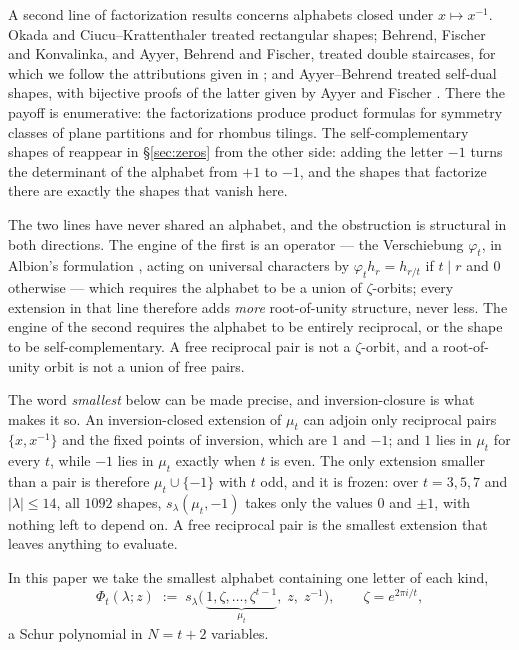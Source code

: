 \documentclass[11pt,reqno]{amsart}
\theoremstyle{plain}
\theoremstyle{definition}
\newcommand{\zt}{\mu_t}
\begin{document}
A second line of factorization results concerns alphabets closed under $x\mapsto x^{-1}$. Okada
\cite{Oka98} and Ciucu--Krattenthaler \cite{CK09} treated rectangular shapes; Behrend, Fischer and
Konvalinka, and Ayyer, Behrend and Fischer, treated double staircases, for which we follow the
attributions given in \cite{AB19}; and Ayyer--Behrend
\cite{AB19} treated self-dual shapes, with bijective proofs of the latter given by Ayyer and Fischer
\cite{AF20}. There the payoff is enumerative: the factorizations produce
product formulas for symmetry classes of plane partitions and for rhombus tilings. The
self-complementary shapes of \cite{AB19} reappear in \S\ref{sec:zeros} from the other side: adding
the letter $-1$ turns the determinant of the alphabet from $+1$ to $-1$, and the shapes that
factorize there are exactly the shapes that vanish here.

The two lines have never shared an alphabet, and the obstruction is structural in both directions.
The engine of the first is an operator --- the Verschiebung $\varphi_t$, in Albion's formulation
\cite{Alb23}, acting on universal characters by $\varphi_t h_r=h_{r/t}$ if $t\mid r$ and $0$
otherwise --- which requires the alphabet to be a union of $\zeta$-orbits; every extension in that
line therefore adds \emph{more} root-of-unity structure, never less. The engine of the second
requires the alphabet to be entirely reciprocal, or the shape to be self-complementary. A free
reciprocal pair is not a $\zeta$-orbit, and a root-of-unity orbit is not a union of free pairs.

The word \emph{smallest} below can be made precise, and inversion-closure is what makes it so. An
inversion-closed extension of $\zt$ can adjoin only reciprocal pairs $\{x,x^{-1}\}$ and the fixed
points of inversion, which are $1$ and $-1$; and $1$ lies in $\zt$ for every $t$, while $-1$ lies in
$\zt$ exactly when $t$ is even. The only extension smaller than a pair is therefore $\zt\cup\{-1\}$
with $t$ odd, and it is frozen: over $t=3,5,7$ and $|\lambda|\le14$, all $1092$ shapes,
$s_\lambda(\zt,-1)$ takes only the values $0$ and $\pm1$, with nothing left to depend on. A free
reciprocal pair is the smallest extension that leaves anything to evaluate.

In this paper we take the smallest alphabet containing one letter of each kind,
\begin{equation}\label{eq:object}
\Phi_t(\lambda;z)\;:=\;s_\lambda\bigl(\,\underbrace{1,\zeta,\dots,\zeta^{t-1}}_{\zt},\;z,\;z^{-1}\bigr),
\qquad \zeta=e^{2\pi i/t},
\end{equation}
a Schur polynomial in $N=t+2$ variables.
\end{document}
